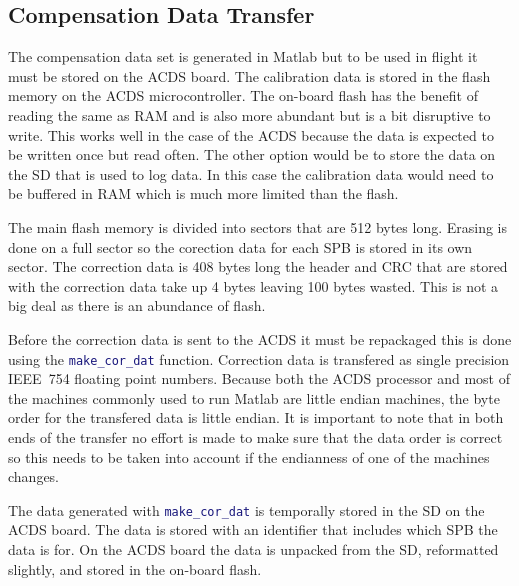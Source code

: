 
\subsection{Compensation Data Transfer}

The compensation data set is generated in Matlab but to be used in flight it must be stored on the \ac{ACDS} board. The calibration data is stored in the flash memory on the \ac{ACDS} microcontroller. The on-board flash has the benefit of reading the same as \ac{RAM} and is also more abundant but is a bit disruptive to write. This works well in the case of the \ac{ACDS} because the data is expected to be written once but read often. The other option would be to store the data on the \ac{SD} that is used to log data. In this case the calibration data would need to be buffered in \ac{RAM} which is much more limited than the flash. 

The main flash memory is divided into sectors that are 512 bytes long. Erasing is done on a full sector so the corection data for each \ac{SPB} is stored in its own sector. The correction data is 408 bytes long the header and \ac{CRC} that are stored with the correction data take up 4 bytes leaving 100 bytes wasted. This is not a big deal as there is an abundance of flash.

Before the correction data is sent to the \ac{ACDS} it must be repackaged this is done using the \lstinline[style=code,language=Matlab]$make_cor_dat$ function. Correction data is transfered as single precision IEEE~754 floating point numbers. Because both the \ac{ACDS} processor and most of the machines commonly used to run Matlab are little endian machines, the byte order for the transfered data is little endian. It is important to note that in both ends of the transfer no effort is made to make sure that the data order is correct so this needs to be taken into account if the endianness of one of the machines changes.

The data generated with \lstinline[style=code,language=Matlab]$make_cor_dat$ is temporally stored in the \ac{SD} on the \ac{ACDS} board. The data is stored with an identifier that includes which \ac{SPB} the data is for. On the \ac{ACDS} board the data is unpacked from the \ac{SD}, reformatted slightly, and stored in the on-board flash. 

